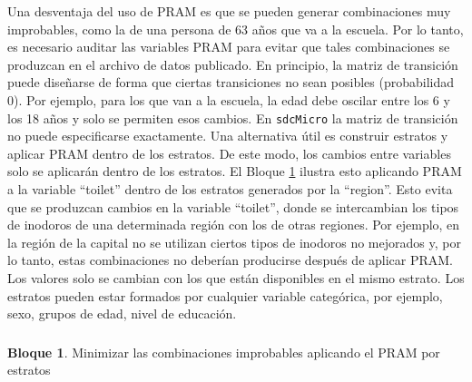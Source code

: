 \documentclass[
]{book}
\newenvironment{Shaded}{\begin{snugshade}}{\end{snugshade}}
\newcommand{\AttributeTok}[1]{\textcolor[rgb]{0.77,0.63,0.00}{#1}}
\newcommand{\CommentTok}[1]{\textcolor[rgb]{0.56,0.35,0.01}{\textit{#1}}}
\newcommand{\FunctionTok}[1]{\textcolor[rgb]{0.00,0.00,0.00}{#1}}
\newcommand{\NormalTok}[1]{#1}
\newcommand{\OtherTok}[1]{\textcolor[rgb]{0.56,0.35,0.01}{#1}}
\newcommand{\SpecialCharTok}[1]{\textcolor[rgb]{0.00,0.00,0.00}{#1}}
\newcommand{\StringTok}[1]{\textcolor[rgb]{0.31,0.60,0.02}{#1}}
\theoremstyle{definition}
\theoremstyle{definition}
\newtheorem{example}{Bloque}[chapter]
\theoremstyle{definition}
\theoremstyle{definition}
\theoremstyle{remark}
\begin{document}
Una desventaja del uso de PRAM es que se pueden generar combinaciones muy improbables, como la de una persona de 63 años que va a la escuela. Por lo tanto, es necesario auditar las variables PRAM para evitar que tales combinaciones se produzcan en el archivo de datos publicado. En principio, la matriz de transición puede diseñarse de forma que ciertas transiciones no sean posibles (probabilidad 0). Por ejemplo, para los que van a la escuela, la edad debe oscilar entre los 6 y los 18 años y solo se permiten esos cambios. En \texttt{sdcMicro} la matriz de transición no puede especificarse exactamente. Una alternativa útil es construir estratos y aplicar PRAM dentro de los estratos. De este modo, los cambios entre variables solo se aplicarán dentro de los estratos. El Bloque \ref{exm:bloque29jgm} ilustra esto aplicando PRAM a la variable ``toilet'' dentro de los estratos generados por la ``region''. Esto evita que se produzcan cambios en la variable ``toilet'', donde se intercambian los tipos de inodoros de una determinada región con los de otras regiones. Por ejemplo, en la región de la capital no se utilizan ciertos tipos de inodoros no mejorados y, por lo tanto, estas combinaciones no deberían producirse después de aplicar PRAM. Los valores solo se cambian con los que están disponibles en el mismo estrato. Los estratos pueden estar formados por cualquier variable categórica, por ejemplo, sexo, grupos de edad, nivel de educación.

\hypertarget{section-3}{%
\subsubsection{}\label{section-3}}

\begin{example}
\protect\hypertarget{exm:bloque29jgm}{}\label{exm:bloque29jgm}Minimizar las combinaciones improbables aplicando el PRAM por estratos
\end{example}

\begin{Shaded}
\end{Shaded}
\end{document}
